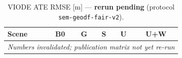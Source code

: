\begin{table}[t]
\centering
\caption{VIODE ATE RMSE [m] --- \textbf{rerun pending} (protocol \texttt{sem-geodf-fair-v2}).}
\label{tab:ate_viode}
\begin{tabular}{lccccc}
\toprule
Scene & B0 & G & S & U & U+W \\
\midrule
\multicolumn{6}{c}{\emph{Numbers invalidated; publication matrix not yet re-run}} \\
\bottomrule
\end{tabular}
\end{table}
